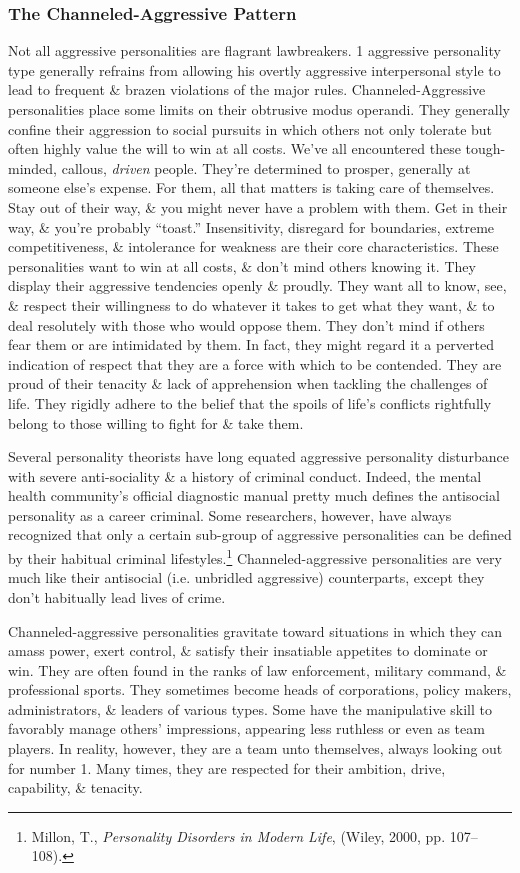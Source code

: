 \documentclass{article}
\numberwithin{equation}{section}
\begin{document}
\subsubsection{The Channeled-Aggressive Pattern}
Not all aggressive personalities are flagrant lawbreakers. 1 aggressive personality type generally refrains from allowing his overtly aggressive interpersonal style to lead to frequent \& brazen violations of the major rules. Channeled-Aggressive personalities place some limits on their obtrusive modus operandi. They generally confine their aggression to social pursuits in which others not only tolerate but often highly value the will to win at all costs. We've all encountered these tough-minded, callous, \textit{driven} people. They're determined to prosper, generally at someone else's expense. For them, all that matters is taking care of themselves. Stay out of their way, \& you might never have a problem with them. Get in their way, \& you're probably ``toast.'' Insensitivity, disregard for boundaries, extreme competitiveness, \& intolerance for weakness are their core characteristics. These personalities want to win at all costs, \& don't mind others knowing it. They display their aggressive tendencies openly \& proudly. They want all to know, see, \& respect their willingness to do whatever it takes to get what they want, \& to deal resolutely with those who would oppose them. They don't mind if others fear them or are intimidated by them. In fact, they might regard it a perverted indication of respect that they are a force with which to be contended. They are proud of their tenacity \& lack of apprehension when tackling the challenges of life. They rigidly adhere to the belief that the spoils of life's conflicts rightfully belong to those willing to fight for \& take them.

Several personality theorists have long equated aggressive personality disturbance with severe anti-sociality \& a history of criminal conduct. Indeed, the mental health community's official diagnostic manual pretty much defines the antisocial personality as a career criminal. Some researchers, however, have always recognized that only a certain sub-group of aggressive personalities can be defined by their habitual criminal lifestyles.\footnote{Millon, T., \textit{Personality Disorders in Modern Life}, (Wiley, 2000, pp. 107--108).} Channeled-aggressive personalities are very much like their antisocial (i.e. unbridled aggressive) counterparts, except they don't habitually lead lives of crime.

Channeled-aggressive personalities gravitate toward situations in which they can amass power, exert control, \& satisfy their insatiable appetites to dominate or win. They are often found in the ranks of law enforcement, military command, \& professional sports. They sometimes become heads of corporations, policy makers, administrators, \& leaders of various types. Some have the manipulative skill to favorably manage others' impressions, appearing less ruthless or even as team players. In reality, however, they are a team unto themselves, always looking out for number 1. Many times, they are respected for their ambition, drive, capability, \& tenacity.
\end{document}
